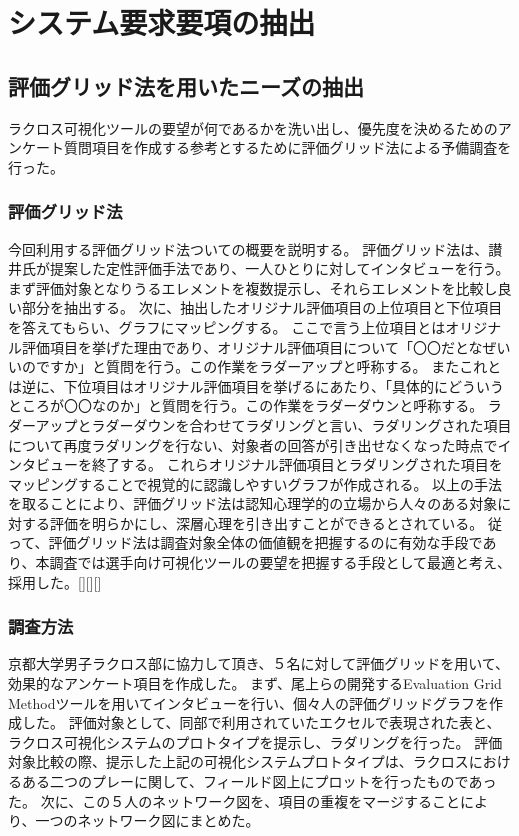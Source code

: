 \documentclass[sotsuron]{kuee}
\begin{document}
\chapter{システム要求要項の抽出}
\section{評価グリッド法を用いたニーズの抽出}
ラクロス可視化ツールの要望が何であるかを洗い出し、優先度を決めるためのアンケート質問項目を作成する参考とするために評価グリッド法による予備調査を行った。
\subsection{評価グリッド法}
今回利用する評価グリッド法ついての概要を説明する。
評価グリッド法は、讃井氏が提案した定性評価手法であり、一人ひとりに対してインタビューを行う。
まず評価対象となりうるエレメントを複数提示し、それらエレメントを比較し良い部分を抽出する。
次に、抽出したオリジナル評価項目の上位項目と下位項目を答えてもらい、グラフにマッピングする。
ここで言う上位項目とはオリジナル評価項目を挙げた理由であり、オリジナル評価項目について「〇〇だとなぜいいのですか」と質問を行う。この作業をラダーアップと呼称する。
またこれとは逆に、下位項目はオリジナル評価項目を挙げるにあたり、「具体的にどういうところが〇〇なのか」と質問を行う。この作業をラダーダウンと呼称する。
ラダーアップとラダーダウンを合わせてラダリングと言い、ラダリングされた項目について再度ラダリングを行ない、対象者の回答が引き出せなくなった時点でインタビューを終了する。
これらオリジナル評価項目とラダリングされた項目をマッピングすることで視覚的に認識しやすいグラフが作成される。
以上の手法を取ることにより、評価グリッド法は認知心理学的の立場から人々のある対象に対する評価を明らかにし、深層心理を引き出すことができるとされている。
従って、評価グリッド法は調査対象全体の価値観を把握するのに有効な手段であり、本調査では選手向け可視化ツールの要望を把握する手段として最適と考え、採用した。[][][]
\subsection{調査方法}
京都大学男子ラクロス部に協力して頂き、５名に対して評価グリッドを用いて、効果的なアンケート項目を作成した。
まず、尾上らの開発するEvaluation Grid Methodツールを用いてインタビューを行い、個々人の評価グリッドグラフを作成した。
評価対象として、同部で利用されていたエクセルで表現された表と、ラクロス可視化システムのプロトタイプを提示し、ラダリングを行った。
評価対象比較の際、提示した上記の可視化システムプロトタイプは、ラクロスにおけるある二つのプレーに関して、フィールド図上にプロットを行ったものであった。
次に、この５人のネットワーク図を、項目の重複をマージすることにより、一つのネットワーク図にまとめた。
\end{document}
